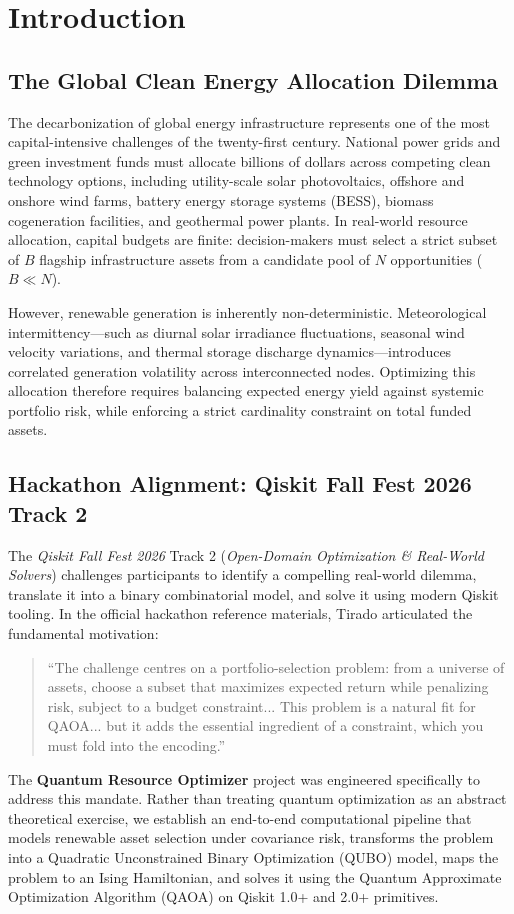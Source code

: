\chapter{Introduction}
\label{chap:introduction}

\section{The Global Clean Energy Allocation Dilemma}
The decarbonization of global energy infrastructure represents one of the most capital-intensive challenges of the twenty-first century. National power grids and green investment funds must allocate billions of dollars across competing clean technology options, including utility-scale solar photovoltaics, offshore and onshore wind farms, battery energy storage systems (BESS), biomass cogeneration facilities, and geothermal power plants. In real-world resource allocation, capital budgets are finite: decision-makers must select a strict subset of $B$ flagship infrastructure assets from a candidate pool of $N$ opportunities ($B \ll N$).

However, renewable generation is inherently non-deterministic. Meteorological intermittency---such as diurnal solar irradiance fluctuations, seasonal wind velocity variations, and thermal storage discharge dynamics---introduces correlated generation volatility across interconnected nodes. Optimizing this allocation therefore requires balancing expected energy yield against systemic portfolio risk, while enforcing a strict cardinality constraint on total funded assets.

\section{Hackathon Alignment: Qiskit Fall Fest 2026 Track 2}
The \textit{Qiskit Fall Fest 2026} Track 2 (\textit{Open-Domain Optimization \& Real-World Solvers}) challenges participants to identify a compelling real-world dilemma, translate it into a binary combinatorial model, and solve it using modern Qiskit tooling. In the official hackathon reference materials, Tirado \cite{tirado2026qaoa} articulated the fundamental motivation:
\begin{quote}
``The challenge centres on a portfolio-selection problem: from a universe of assets, choose a subset that maximizes expected return while penalizing risk, subject to a budget constraint... This problem is a natural fit for QAOA... but it adds the essential ingredient of a constraint, which you must fold into the encoding.''
\end{quote}
The \textbf{Quantum Resource Optimizer} project was engineered specifically to address this mandate. Rather than treating quantum optimization as an abstract theoretical exercise, we establish an end-to-end computational pipeline that models renewable asset selection under covariance risk, transforms the problem into a Quadratic Unconstrained Binary Optimization (QUBO) model, maps the problem to an Ising Hamiltonian, and solves it using the Quantum Approximate Optimization Algorithm (QAOA) on Qiskit 1.0+ and 2.0+ primitives.

